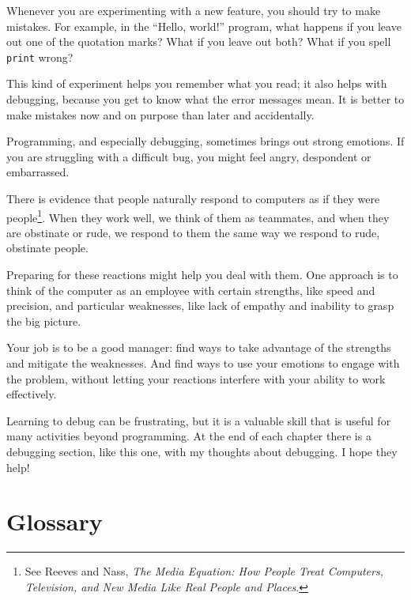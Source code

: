 \documentclass[10pt]{book}
\begin{document}
Whenever you are experimenting with a new feature, you should try
to make mistakes.  For example, in the ``Hello, world!'' program,
what happens if you leave out one of the quotation marks?  What
if you leave out both?  What if you spell {\tt print} wrong?


This kind of experiment helps you remember what you read; it also helps
with debugging, because you get to know what the error messages mean.
It is better to make mistakes now and on purpose than later
and accidentally.

Programming, and especially debugging, sometimes brings out strong
emotions.  If you are struggling with a difficult bug, you might 
feel angry, despondent or embarrassed.

There is evidence that people naturally respond to computers as if
they were people\footnote{See Reeves and Nass, {\it The Media
    Equation: How People Treat Computers, Television, and New Media
    Like Real People and Places}.}.  When they work well, we think
of them as teammates, and when they are obstinate or rude, we
respond to them the same way we respond to rude,
obstinate people.


Preparing for these reactions might help you deal with them.
One approach is to think of the computer as an employee with
certain strengths, like speed and precision, and
particular weaknesses, like lack of empathy and inability
to grasp the big picture.

Your job is to be a good manager: find ways to take advantage
of the strengths and mitigate the weaknesses.  And find ways
to use your emotions to engage with the problem,
without letting your reactions interfere with your ability
to work effectively.

Learning to debug can be frustrating, but it is a valuable skill
that is useful for many activities beyond programming.  At the
end of each chapter there is a debugging section, like this one,
with my thoughts about debugging.  I hope they help!


\section{Glossary}
\end{document}
